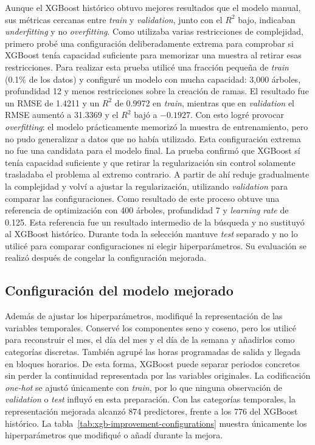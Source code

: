 \documentclass[a4paper,12pt,twocolumn]{report}
\begin{document}
Aunque el XGBoost histórico obtuvo mejores resultados que el modelo manual, sus métricas cercanas entre \textit{train} y \textit{validation}, junto con el $R^2$ bajo, indicaban \textit{underfitting} y no \textit{overfitting}. Como utilizaba varias restricciones de complejidad, primero probé una configuración deliberadamente extrema para comprobar si XGBoost tenía capacidad suficiente para memorizar una muestra al retirar esas restricciones.
\newline
Para realizar esta prueba utilicé una fracción pequeña de \textit{train} (0.1\% de los datos) y configuré un modelo con mucha capacidad: 3,000 árboles, profundidad 12 y menos restricciones sobre la creación de ramas. El resultado fue un RMSE de 1.4211 y un $R^2$ de 0.9972 en \textit{train}, mientras que en \textit{validation} el RMSE aumentó a 31.3369 y el $R^2$ bajó a $-0.1927$. Con esto logré provocar \textit{overfitting}: el modelo prácticamente memorizó la muestra de entrenamiento, pero no pudo generalizar a datos que no había utilizado.
\newline
Esta configuración extrema no fue una candidata para el modelo final. La prueba confirmó que XGBoost sí tenía capacidad suficiente y que retirar la regularización sin control solamente trasladaba el problema al extremo contrario. A partir de ahí reduje gradualmente la complejidad y volví a ajustar la regularización, utilizando \textit{validation} para comparar las configuraciones. Como resultado de este proceso obtuve una referencia de optimización con 400 árboles, profundidad 7 y \textit{learning rate} de 0.125. Esta referencia fue un resultado intermedio de la búsqueda y no sustituyó al XGBoost histórico.
\newline
Durante toda la selección mantuve \textit{test} separado y no lo utilicé para comparar configuraciones ni elegir hiperparámetros. Su evaluación se realizó después de congelar la configuración mejorada.

\subsection{Configuración del modelo mejorado}

Además de ajustar los hiperparámetros, modifiqué la representación de las variables temporales. Conservé los componentes seno y coseno, pero los utilicé para reconstruir el mes, el día del mes y el día de la semana y añadirlos como categorías discretas. También agrupé las horas programadas de salida y llegada en bloques horarios. De esta forma, XGBoost puede separar periodos concretos sin perder la continuidad representada por las variables originales. La codificación \textit{one-hot} se ajustó únicamente con \textit{train}, por lo que ninguna observación de \textit{validation} o \textit{test} influyó en esta preparación. Con las categorías temporales, la representación mejorada alcanzó 874 predictores, frente a los 776 del XGBoost histórico. La tabla~\ref{tab:xgb-improvement-configurations} muestra únicamente los hiperparámetros que modifiqué o añadí durante la mejora.
\newline
\end{document}
